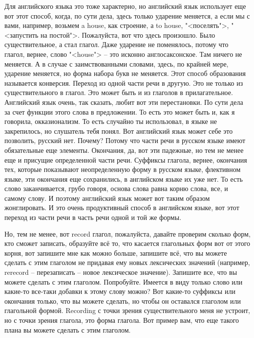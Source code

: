 \documentclass[main.tex]{subfiles}
\begin{document}
Для английского языка это тоже характерно, но английский язык использует еще вот этот способ, когда, по сути дела, здесь только ударение меняется, а если мы с вами, например, возьмем a house, как строение, а to house, "<поселять">, "<запустить на постой">.
Пожалуйста, вот что здесь произошло.
Было существительное, а стал глагол.
Даже ударение не поменялось, потому что глагол, вернее, слово "<house"> -- это исконно англосаксонское.
Там ничего не меняется.
А в случае с заимствованными словами, здесь, по крайней мере, ударение меняется, но форма набора букв не меняется.
Этот способ образования называется конверсия.
Переход из одной части речи в другую.
Это не только из существительного в глагол.
Это может быть и из глаголов в прилагательное.
Английский язык очень, так сказать, любит вот эти перестановки.
По сути дела за счет функции этого слова в предложении.
То есть это может быть и, как я говорила, окказионализм.
То есть случайно ты использовал, в языке не закрепилось, но слушатель тебя понял.
Вот английский язык может себе это позволить, русский нет.
Почему?
Потому что части речи в русском языке имеют обязательные еще элементы.
Окончания, да, вот эти падежные, но тем не менее еще и присущие определенной части речи.
Суффиксы глагола, вернее, окончания тех, которые показывают неопределенную форму в русском языке, флективном языке, эти окончания еще сохранились, в английском языке их уже нет.
То есть слово заканчивается, грубо говоря, основа слова равна корню слова, все, и самому слову.
И поэтому английский язык может вот таким образом жонглировать.
И это очень продуктивный способ в английском языке, вот этот переход из части речи в часть речи одной и той же формы.

Но, тем не менее, вот record глагол, пожалуйста, давайте проверим сколько форм, кто сможет записать, образуйте всё то, что касается глагольных форм вот от этого корня, вот запишите мне как можно больше, запишите всё, что вы можете сделать с этим глаголом не придавая ему новых лексических значений (например, rerecord -- перезаписать -- новое лексическое значение).
Запишите все, что вы можете сделать с этим глаголом.
Попробуйте.
Имеется в виду только слово или какие-то все-таки добавки к этому слову можно?
Вот какие-то суффиксы или окончания только, что вы можете сделать, но чтобы он оставался глаголом или глагольной формой.
Recording с точки зрения существительного меня не устроит, но с точки зрения глагола, это форма глагола.
Вот пример вам, что еще такого плана вы можете сделать с этим глаголом.
\\
\end{document}
